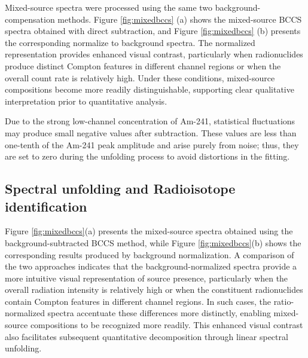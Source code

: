 \documentclass[10pt]{wlscirep}
\begin{document}




Mixed-source spectra were processed using the same two background-compensation methods. Figure \ref{fig:mixedbccs} (a) shows the mixed-source BCCS spectra obtained with direct subtraction, and Figure \ref{fig:mixedbccs} (b) presents the corresponding normalize to background spectra. The normalized representation provides enhanced visual contrast, particularly when radionuclides produce distinct Compton features in different channel regions or when the overall count rate is relatively high. Under these conditions, mixed-source compositions become more readily distinguishable, supporting clear qualitative interpretation prior to quantitative analysis.

Due to the strong low-channel concentration of Am-241, statistical fluctuations may produce small negative values after subtraction. These values are less than one-tenth of the Am-241 peak amplitude and arise purely from noise; thus, they are set to zero during the unfolding process to avoid distortions in the fitting.




\subsection*{Spectral unfolding and Radioisotope identification}

Figure \ref{fig:mixedbccs}(a) presents the mixed-source spectra obtained using the background-subtracted BCCS method, while Figure \ref{fig:mixedbccs}(b) shows the corresponding results produced by background normalization. A comparison of the two approaches indicates that the background-normalized spectra provide a more intuitive visual representation of source presence, particularly when the overall radiation intensity is relatively high or when the constituent radionuclides contain Compton features in different channel regions. In such cases, the ratio-normalized spectra accentuate these differences more distinctly, enabling mixed-source compositions to be recognized more readily. This enhanced visual contrast also facilitates subsequent quantitative decomposition through linear spectral unfolding.
\end{document}
